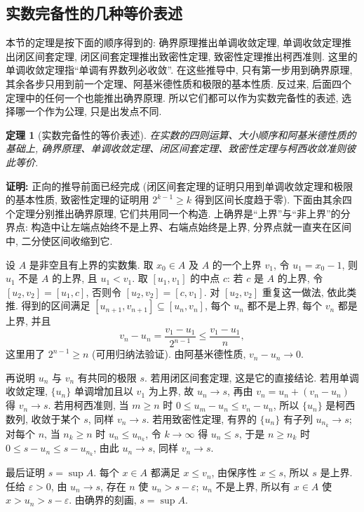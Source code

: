 \documentclass[UTF8,openany]{ctexbook}
\theoremstyle{chinesetextbook}
\newtheorem{theorem}{定理}[section]
\newenvironment{cnproof}{\par\indent\textbf{证明:} \ignorespaces}{\par}
\begin{document}
\subsection{实数完备性的几种等价表述}
本节的定理是按下面的顺序得到的: 确界原理推出单调收敛定理, 单调收敛定理推出闭区间套定理, 闭区间套定理推出致密性定理, 致密性定理推出柯西准则. 这里的单调收敛定理指“单调有界数列必收敛”. 在这些推导中, 只有第一步用到确界原理, 其余各步只用到前一个定理、阿基米德性质和极限的基本性质. 反过来, 后面四个定理中的任何一个也能推出确界原理. 所以它们都可以作为实数完备性的表述, 选择哪一个作为公理, 只是出发点不同.
\begin{theorem}[实数完备性的等价表述]
在实数的四则运算、大小顺序和阿基米德性质的基础上, 确界原理、单调收敛定理、闭区间套定理、致密性定理与柯西收敛准则彼此等价.
\end{theorem}
\begin{cnproof}
正向的推导前面已经完成 (闭区间套定理的证明只用到单调收敛定理和极限的基本性质, 致密性定理的证明用 $2^{k-1}\ge k$ 得到区间长度趋于零). 下面由其余四个定理分别推出确界原理, 它们共用同一个构造. 上确界是“上界”与“非上界”的分界点: 构造中让左端点始终不是上界、右端点始终是上界, 分界点就一直夹在区间中, 二分使区间收缩到它.

设 $A$ 是非空且有上界的实数集. 取 $x_0\in A$ 及 $A$ 的一个上界 $v_1$, 令 $u_1=x_0-1$, 则 $u_1$ 不是 $A$ 的上界, 且 $u_1<v_1$. 取 $[u_1,v_1]$ 的中点 $c$: 若 $c$ 是 $A$ 的上界, 令 $[u_2,v_2]=[u_1,c]$, 否则令 $[u_2,v_2]=[c,v_1]$. 对 $[u_2,v_2]$ 重复这一做法, 依此类推. 得到的区间满足 $[u_{n+1},v_{n+1}]\subseteq[u_n,v_n]$, 每个 $u_n$ 都不是上界, 每个 $v_n$ 都是上界, 并且
\[
v_n-u_n=\frac{v_1-u_1}{2^{n-1}}\le\frac{v_1-u_1}n,
\]
这里用了 $2^{n-1}\ge n$ (可用归纳法验证). 由阿基米德性质, $v_n-u_n\to0$.

再说明 $u_n$ 与 $v_n$ 有共同的极限 $s$. 若用闭区间套定理, 这是它的直接结论. 若用单调收敛定理, $\{u_n\}$ 单调增加且以 $v_1$ 为上界, 故 $u_n\to s$, 再由 $v_n=u_n+(v_n-u_n)$ 得 $v_n\to s$. 若用柯西准则, 当 $m\ge n$ 时 $0\le u_m-u_n\le v_n-u_n$, 所以 $\{u_n\}$ 是柯西数列, 收敛于某个 $s$, 同样 $v_n\to s$. 若用致密性定理, 有界的 $\{u_n\}$ 有子列 $u_{n_k}\to s$; 对每个 $n$, 当 $n_k\ge n$ 时 $u_n\le u_{n_k}$, 令 $k\to\infty$ 得 $u_n\le s$, 于是 $n\ge n_k$ 时 $0\le s-u_n\le s-u_{n_k}$, 由此 $u_n\to s$, 同样 $v_n\to s$.

最后证明 $s=\sup A$. 每个 $x\in A$ 都满足 $x\le v_n$, 由保序性 $x\le s$, 所以 $s$ 是上界. 任给 $\varepsilon>0$, 由 $u_n\to s$, 存在 $n$ 使 $u_n>s-\varepsilon$; $u_n$ 不是上界, 所以有 $x\in A$ 使 $x>u_n>s-\varepsilon$. 由确界的刻画, $s=\sup A$.
\end{cnproof}
\end{document}
